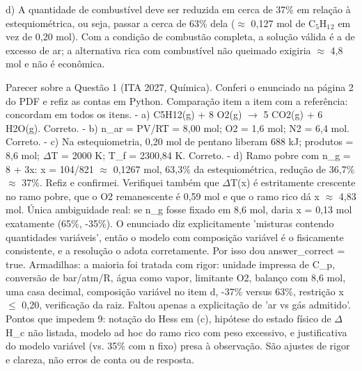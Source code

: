 \documentclass{article}%
\begin{document}
d) A quantidade de combustível deve ser reduzida em cerca de 37\% em relação à estequiométrica, ou seja, passar a cerca de 63\% dela ($\approx$ 0,127 mol de C$_{5}$H$_{1}$$_{2}$ em vez de 0,20 mol). Com a condição de combustão completa, a solução válida é a de excesso de ar; a alternativa rica com combustível não queimado exigiria $\approx$ 4,8 mol e não é econômica.\par %
Parecer sobre a Questão 1 (ITA 2027, Química). Conferi o enunciado na página 2 do PDF e refiz as contas em Python.\newline%
\newline%
Comparação item a item com a referência: concordam em todos os itens.\newline%
{-} a) C5H12(g) + 8 O2(g) $\to$ 5 CO2(g) + 6 H2O(g). Correto.\newline%
{-} b) n\_ar = PV/RT = 8,00 mol; O2 = 1,6 mol; N2 = 6,4 mol. Correto.\newline%
{-} c) Na estequiometria, 0,20 mol de pentano liberam 688 kJ; produtos = 8,6 mol; $\Delta$T = 2000 K; T\_f = 2300,84 K. Correto.\newline%
{-} d) Ramo pobre com n\_g = 8 + 3x: x = 104/821 $\approx$ 0,1267 mol, 63,3\% da estequiométrica, redução de 36,7\% $\approx$ 37\%. Refiz e confirmei. Verifiquei também que $\Delta$T(x) é estritamente crescente no ramo pobre, que o O2 remanescente é 0,59 mol e que o ramo rico dá x $\approx$ 4,83 mol.\newline%
\newline%
Única ambiguidade real: se n\_g fosse fixado em 8,6 mol, daria x = 0,13 mol exatamente (65\%, -35\%). O enunciado diz explicitamente 'misturas contendo quantidades variáveis', então o modelo com composição variável é o fisicamente consistente, e a resolução o adota corretamente. Por isso dou answer\_correct = true.\newline%
\newline%
Armadilhas: a maioria foi tratada com rigor: unidade impressa de C\_p, conversão de bar/atm/R, água como vapor, limitante O2, balanço com 8,6 mol, uma casa decimal, composição variável no item d, -37\% versus 63\%, restrição x $\leq$ 0,20, verificação da raiz. Faltou apenas a explicitação de 'ar vs gás admitido'.\newline%
\newline%
Pontos que impedem 9: notação do Hess em (c), hipótese do estado físico de $\Delta$H\_c não listada, modelo ad hoc do ramo rico com peso excessivo, e justificativa do modelo variável (vs. 35\% com n fixo) presa à observação. São ajustes de rigor e clareza, não erros de conta ou de resposta.%
$$
\end{document}
